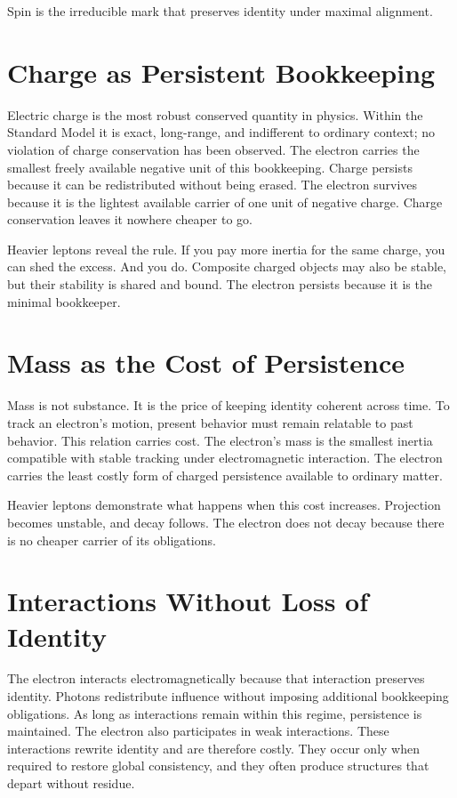 \documentclass[11pt,twoside,openright]{book}
\begin{document}
Spin is the irreducible mark that preserves identity under maximal alignment.

\section*{Charge as Persistent Bookkeeping}

Electric charge is the most robust conserved quantity in physics. Within the Standard Model it is exact, long-range, and indifferent to ordinary context; no violation of charge conservation has been observed. The electron carries the smallest freely available negative unit of this bookkeeping. Charge persists because it can be redistributed without being erased. The electron survives because it is the lightest available carrier of one unit of negative charge. Charge conservation leaves it nowhere cheaper to go.

Heavier leptons reveal the rule. If you pay more inertia for the same charge, you can shed the excess. And you do. Composite charged objects may also be stable, but their stability is shared and bound. The electron persists because it is the minimal bookkeeper.

\section*{Mass as the Cost of Persistence}

Mass is not substance. It is the price of keeping identity coherent across time. To track an electron's motion, present behavior must remain relatable to past behavior. This relation carries cost. The electron's mass is the smallest inertia compatible with stable tracking under electromagnetic interaction. The electron carries the least costly form of charged persistence available to ordinary matter.

Heavier leptons demonstrate what happens when this cost increases. Projection becomes unstable, and decay follows. The electron does not decay because there is no cheaper carrier of its obligations.

\section*{Interactions Without Loss of Identity}

The electron interacts electromagnetically because that interaction preserves identity. Photons redistribute influence without imposing additional bookkeeping obligations. As long as interactions remain within this regime, persistence is maintained. The electron also participates in weak interactions. These interactions rewrite identity and are therefore costly. They occur only when required to restore global consistency, and they often produce structures that depart without residue.
\end{document}
